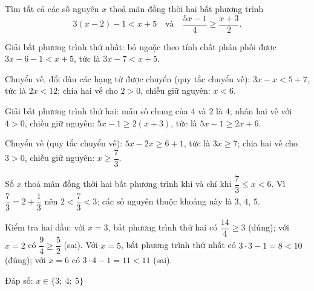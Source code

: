 \begin{problem}[9DS-BPT-015]
Tìm tất cả các số nguyên $x$ thoả mãn đồng thời hai bất phương trình
\[ 3(x - 2) - 1 < x + 5 \quad \text{và} \quad \dfrac{5x - 1}{4} \geq \dfrac{x + 3}{2}. \]

\begin{solution}
Giải bất phương trình thứ nhất: bỏ ngoặc theo tính chất phân phối được $3x - 6 - 1 < x + 5$, tức là $3x - 7 < x + 5$.

Chuyển vế, đổi dấu các hạng tử được chuyển (quy tắc chuyển vế): $3x - x < 5 + 7$, tức là $2x < 12$; chia hai vế cho $2 > 0$, chiều giữ nguyên: $x < 6$.

Giải bất phương trình thứ hai: mẫu số chung của $4$ và $2$ là $4$; nhân hai vế với $4 > 0$, chiều giữ nguyên: $5x - 1 \geq 2(x + 3)$, tức là $5x - 1 \geq 2x + 6$.

Chuyển vế (quy tắc chuyển vế): $5x - 2x \geq 6 + 1$, tức là $3x \geq 7$; chia hai vế cho $3 > 0$, chiều giữ nguyên: $x \geq \dfrac{7}{3}$.

Số $x$ thoả mãn đồng thời hai bất phương trình khi và chỉ khi $\dfrac{7}{3} \leq x < 6$. Vì $\dfrac{7}{3} = 2 + \dfrac{1}{3}$ nên $2 < \dfrac{7}{3} < 3$; các số nguyên thuộc khoảng này là $3$, $4$, $5$.

Kiểm tra hai đầu: với $x = 3$, bất phương trình thứ hai có $\dfrac{14}{4} \geq 3$ (đúng); với $x = 2$ có $\dfrac{9}{4} \geq \dfrac{5}{2}$ (sai). Với $x = 5$, bất phương trình thứ nhất có $3 \cdot 3 - 1 = 8 < 10$ (đúng); với $x = 6$ có $3 \cdot 4 - 1 = 11 < 11$ (sai).

Đáp số: $\boxed{x \in \{3;\ 4;\ 5\}}$
\end{solution}
\end{problem}

